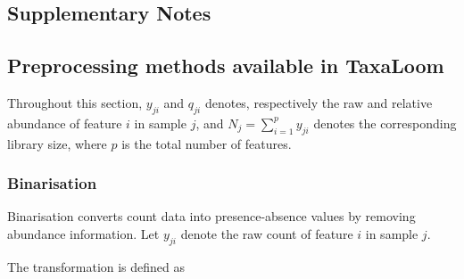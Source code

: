 \begin{bibunit}[apalike]
\begin{appendices}




\clearpage

\section{Supplementary Notes}

\subsection{Preprocessing methods available in TaxaLoom}\label{secA1}


Throughout this section, $y_{ji}$ and $q_{ji}$ denotes, respectively the raw and relative abundance of feature $i$ in sample $j$, and $N_j=\sum_{i=1}^{p}y_{ji}$ denotes the corresponding library size, where $p$ is the total number of features.

\subsubsection*{Binarisation}

Binarisation converts count data into presence-absence values by removing abundance information. Let $y_{ji}$ denote the raw count of feature $i$ in sample $j$.

The transformation is defined as


\end{appendices}
\end{bibunit}
